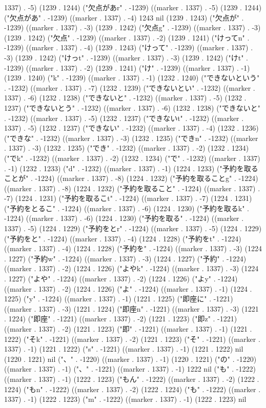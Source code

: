 1337) . -5) (1239 . 1244) ("欠点があr" . -1239) ((marker . 1337) . -5) (1239 . 1244) ("欠点があ" . -1239) ((marker . 1337) . -4) 1243 nil (1239 . 1243) ("欠点が" . -1239) ((marker . 1337) . -3) (1239 . 1242) ("欠点g" . -1239) ((marker . 1337) . -3) (1239 . 1242) ("欠点" . -1239) ((marker . 1337) . -2) (1239 . 1241) ("けってn" . -1239) ((marker . 1337) . -4) (1239 . 1243) ("けって" . -1239) ((marker . 1337) . -3) (1239 . 1242) ("けっt" . -1239) ((marker . 1337) . -3) (1239 . 1242) ("けt" . -1239) ((marker . 1337) . -2) (1239 . 1241) ("け" . -1239) ((marker . 1337) . -1) (1239 . 1240) ("k" . -1239) ((marker . 1337) . -1) (1232 . 1240) ("できないという" . -1232) ((marker . 1337) . -7) (1232 . 1239) ("できないとい" . -1232) ((marker . 1337) . -6) (1232 . 1238) ("できないと" . -1232) ((marker . 1337) . -5) (1232 . 1237) ("できないとう" . -1232) ((marker . 1337) . -6) (1232 . 1238) ("できないと" . -1232) ((marker . 1337) . -5) (1232 . 1237) ("できないt" . -1232) ((marker . 1337) . -5) (1232 . 1237) ("できない" . -1232) ((marker . 1337) . -4) (1232 . 1236) ("できな" . -1232) ((marker . 1337) . -3) (1232 . 1235) ("できn" . -1232) ((marker . 1337) . -3) (1232 . 1235) ("でき" . -1232) ((marker . 1337) . -2) (1232 . 1234) ("でk" . -1232) ((marker . 1337) . -2) (1232 . 1234) ("で" . -1232) ((marker . 1337) . -1) (1232 . 1233) ("d" . -1232) ((marker . 1337) . -1) (1224 . 1233) ("予約を取ることが" . -1224) ((marker . 1337) . -8) (1224 . 1232) ("予約を取ることg" . -1224) ((marker . 1337) . -8) (1224 . 1232) ("予約を取ること" . -1224) ((marker . 1337) . -7) (1224 . 1231) ("予約を取るこt" . -1224) ((marker . 1337) . -7) (1224 . 1231) ("予約をとるこ" . -1224) ((marker . 1337) . -6) (1224 . 1230) ("予約を取るk" . -1224) ((marker . 1337) . -6) (1224 . 1230) ("予約を取る" . -1224) ((marker . 1337) . -5) (1224 . 1229) ("予約をとr" . -1224) ((marker . 1337) . -5) (1224 . 1229) ("予約をと" . -1224) ((marker . 1337) . -4) (1224 . 1228) ("予約をt" . -1224) ((marker . 1337) . -4) (1224 . 1228) ("予約を" . -1224) ((marker . 1337) . -3) (1224 . 1227) ("予約w" . -1224) ((marker . 1337) . -3) (1224 . 1227) ("予約" . -1224) ((marker . 1337) . -2) (1224 . 1226) ("よやk" . -1224) ((marker . 1337) . -3) (1224 . 1227) ("よや" . -1224) ((marker . 1337) . -2) (1224 . 1226) ("よy" . -1224) ((marker . 1337) . -2) (1224 . 1226) ("よ" . -1224) ((marker . 1337) . -1) (1224 . 1225) ("y" . -1224) ((marker . 1337) . -1) (1221 . 1225) ("即座に" . -1221) ((marker . 1337) . -3) (1221 . 1224) ("即座n" . -1221) ((marker . 1337) . -3) (1221 . 1224) ("即座" . -1221) ((marker . 1337) . -2) (1221 . 1223) ("即z" . -1221) ((marker . 1337) . -2) (1221 . 1223) ("即" . -1221) ((marker . 1337) . -1) (1221 . 1222) ("そk" . -1221) ((marker . 1337) . -2) (1221 . 1223) ("そ" . -1221) ((marker . 1337) . -1) (1221 . 1222) ("s" . -1221) ((marker . 1337) . -1) (1221 . 1222) nil (1220 . 1221) nil ("、" . -1220) ((marker . 1337) . -1) (1220 . 1221) ("の" . -1220) ((marker . 1337) . -1) ("、" . -1221) ((marker . 1337) . -1) 1222 nil ("も" . -1222) ((marker . 1337) . -1) (1222 . 1223) ("もん" . -1222) ((marker . 1337) . -2) (1222 . 1224) ("もn" . -1222) ((marker . 1337) . -2) (1222 . 1224) ("も" . -1222) ((marker . 1337) . -1) (1222 . 1223) ("m" . -1222) ((marker . 1337) . -1) (1222 . 1223) nil 